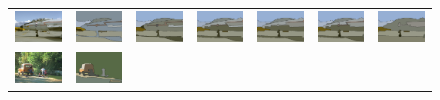 \begin{figure}
\begin{center}
\begin{tabular}{ c  c  c  c  c  c  c }
\includegraphics[width=2cm]{fig/visual_result/visual_result_1_1.png}
&\includegraphics[width=2cm]{fig/visual_result/visual_result_1_2.png}
&\includegraphics[width=2cm]{fig/visual_result/visual_result_1_3.png}
&\includegraphics[width=2cm]{fig/visual_result/visual_result_1_4.png}
&\includegraphics[width=2cm]{fig/visual_result/visual_result_1_5.png}
&\includegraphics[width=2cm]{fig/visual_result/visual_result_1_6.png}
&\includegraphics[width=2cm]{fig/visual_result/visual_result_1_7.png}
\\
\includegraphics[width=2cm]{fig/visual_result/visual_result_2_1.png}
&\includegraphics[width=2cm]{fig/visual_result/visual_result_2_2.png}

\end{tabular}
\end{center}
\end{figure}
